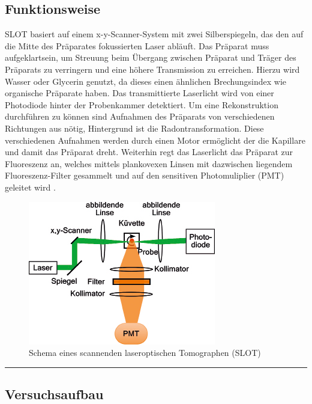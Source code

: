 \subsection{Funktionsweise}
\begin{minipage}{\linewidth}
SLOT basiert auf einem x-y-Scanner-System mit zwei Silberspiegeln, das den auf die Mitte des Präparates fokussierten Laser abläuft. Das Präparat muss \glqq aufgeklart\grqq sein, um Streuung beim Übergang zwischen Präparat und Träger des Präparats zu verringern und eine höhere Transmission zu erreichen. Hierzu wird Wasser oder Glycerin genutzt, da dieses einen ähnlichen Brechungsindex wie organische Präparate haben. Das transmittierte Laserlicht wird von einer Photodiode hinter der Probenkammer detektiert. Um eine Rekonstruktion durchführen zu können sind Aufnahmen des Präparats von verschiedenen Richtungen aus nötig, Hintergrund ist die Radontransformation. Diese verschiedenen Aufnahmen werden durch einen Motor ermöglicht der die Kapillare und damit das Präparat dreht. Weiterhin regt das Laserlicht das Präparat zur Fluoreszenz an, welches mittels plankovexen Linsen mit dazwischen liegendem Fluoreszenz-Filter gesammelt und auf den sensitiven Photomuliplier (PMT) geleitet wird \cite{Anleitung}.\\

\begin{figure}[H]
	\centering
\includegraphics[width=0.6\linewidth]{IMAGE/slot_schema.png}
	\caption{Schema eines scannenden laseroptischen Tomographen (SLOT) \cite{slot_paper}}
	\label{fig:schema}
\end{figure} 
\end{minipage}

 \nopagebreak
 \hrule height 0pt
 \pagebreak[2]

\subsection{Versuchsaufbau}

